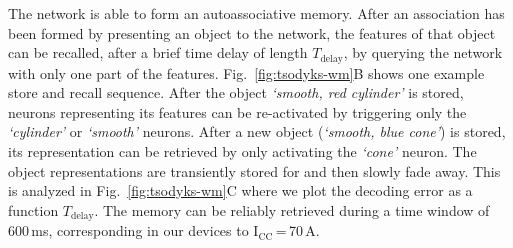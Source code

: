 The network is able to form an autoassociative memory. After an association has been formed by presenting an object to the network, the features of that object can be recalled, after a brief time delay of length $T_\text{delay}$, by querying the network with only one part of the features. Fig.~\ref{fig:tsodyks-wm}B shows one example store and recall sequence. After the object \textit{`smooth, red cylinder'} is stored, neurons representing its features can be re-activated by triggering only the \textit{`cylinder'} or \textit{`smooth'} neurons. After a new object (\textit{`smooth, blue cone'}) is stored, its representation can be retrieved by only activating the \textit{`cone'} neuron. The object representations are transiently stored for and then slowly fade away. This is analyzed in Fig.~\ref{fig:tsodyks-wm}C where we plot the decoding error as a function $T_\text{delay}$. The memory can be reliably retrieved during a time window of 600\,ms, corresponding in our devices to I$\mathrm{_{CC}}$\,=\,70\,\textmu A.

